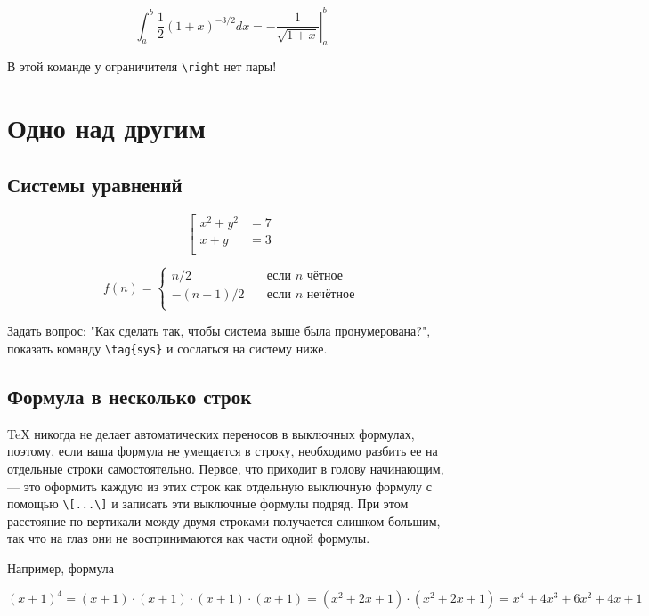 \documentclass[12pt, a4paper]{article}
\begin{document}
\[ \int_a^b \frac{1}{2} (1+x)^{-3/2} dx = \left. -\frac{1}{\sqrt{1+x}} \right|_a^b \]

В этой команде у ограничителя  \verb|\right| нет пары!







\section{Одно над другим}

\subsection{Системы уравнений}

\[
	\left[
	\begin{aligned}
		x^2+y^2&=7\\
		x+y & = 3 \\
	\end{aligned}
	\right.
\]

\[ f(n) =
  \begin{cases}
    n/2       & \quad \text{если } n \text{ чётное}\\
    -(n+1)/2  & \quad \text{если } n \text{ нечётное}\\
  \end{cases}
\]

Задать вопрос: "Как сделать так, чтобы система выше была пронумерована?", показать команду \verb|\tag{sys}| и сослаться на систему ниже.






\subsection{Формула в несколько строк}

\TeX{} никогда не делает автоматических переносов в выключных формулах, поэтому, если ваша формула не умещается в строку, необходимо разбить ее на отдельные строки самостоятельно. Первое, что приходит в голову начинающим, — это оформить каждую из этих строк как отдельную выключную формулу с помощью \verb|\[...\]| и записать эти выключные формулы подряд. При этом расстояние по вертикали между двумя строками получается слишком большим, так что на глаз они не воспринимаются как части одной формулы.

Например, формула 

 \[(x+1)^4 = (x+1) \cdot (x+1) \cdot (x+1) \cdot (x+1) = (x^2 + 2x + 1) \cdot (x^2 + 2x + 1) = x^4 + 4x^3 + 6x^2 + 4x+ 1 \]
 
\end{document}
